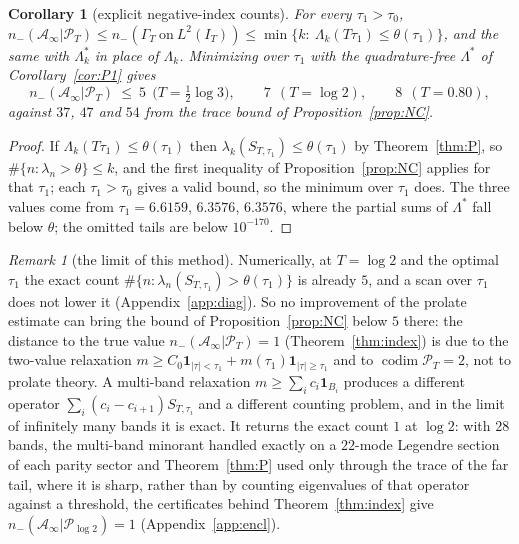 \documentclass[11pt]{amsart}
\newtheorem{corollary}[theorem]{Corollary}
\theoremstyle{definition}
\theoremstyle{remark}
\newtheorem{remark}[theorem]{Remark}
\newcommand{\PT}{\mathcal P_T}
\newcommand{\IT}{I_T}
\newcommand{\Ainf}{\mathcal A_\infty}
\begin{document}
\begin{corollary}[explicit negative-index counts]\label{cor:P3}
For every $\tau_1>\tau_0$, $n_-(\Ainf|\PT)\le n_-(\Gamma_T\ \text{on}\ L^2(\IT))\le\min\{k:\
\Lambda_k(T\tau_1)\le\theta(\tau_1)\}$, and the same with $\Lambda^*_k$ in place of $\Lambda_k$.
Minimizing over $\tau_1$ with the quadrature-free $\Lambda^*$ of Corollary~\ref{cor:P1} gives
\[
n_-(\Ainf|\PT)\ \le\ 5\ \ \big(T=\tfrac12\log3\big),\qquad 7\ \ (T=\log2),\qquad 8\ \ (T=0.80),
\]
against $37$, $47$ and $54$ from the trace bound of Proposition~\ref{prop:NC}.
\end{corollary}
\begin{proof}
If $\Lambda_k(T\tau_1)\le\theta(\tau_1)$ then $\lambda_k(S_{T,\tau_1})\le\theta(\tau_1)$ by
Theorem~\ref{thm:P}, so $\#\{n:\lambda_n>\theta\}\le k$, and the first inequality of
Proposition~\ref{prop:NC} applies for that $\tau_1$; each $\tau_1>\tau_0$ gives a valid bound, so the
minimum over $\tau_1$ does. The three values come from $\tau_1=6.6159$, $6.3576$, $6.3576$, where the
partial sums of $\Lambda^*$ fall below $\theta$; the omitted tails are below $10^{-170}$.
\end{proof}

\begin{remark}[the limit of this method]\label{rem:P4}
Numerically, at $T=\log2$ and the optimal $\tau_1$ the exact count
$\#\{n:\lambda_n(S_{T,\tau_1})>\theta(\tau_1)\}$ is already $5$, and a scan over $\tau_1$ does not
lower it (Appendix~\ref{app:diag}). So no improvement of the prolate estimate can bring the bound of
Proposition~\ref{prop:NC} below $5$ there: the distance to the true value $n_-(\Ainf|\PT)=1$
(Theorem~\ref{thm:index}) is due to the two-value relaxation $m\ge C_0\mathbf 1_{|\tau|<\tau_1}+
m(\tau_1)\mathbf 1_{|\tau|\ge\tau_1}$ and to $\operatorname{codim}\PT=2$, not to prolate theory. A
multi-band relaxation $m\ge\sum_ic_i\mathbf 1_{B_i}$ produces a different operator
$\sum_i(c_i-c_{i+1})S_{T,\tau_i}$ and a different counting problem, and in the limit of infinitely many
bands it is exact. It returns the exact count $1$ at $\log2$: with $28$ bands, the multi-band minorant
handled exactly on a $22$-mode Legendre section of each parity sector and Theorem~\ref{thm:P} used only
through the trace of the far tail, where it is sharp, rather than by counting eigenvalues of that operator
against a threshold, the certificates behind Theorem~\ref{thm:index} give $n_-(\Ainf|\mathcal P_{\log2})=1$
(Appendix~\ref{app:encl}).
\end{remark}
\end{document}

